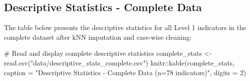 \documentclass[
  letterpaper,
  DIV=11,
  numbers=noendperiod]{scrartcl}
\newenvironment{Shaded}{\begin{snugshade}}{\end{snugshade}}
\newcommand{\AttributeTok}[1]{\textcolor[rgb]{0.40,0.45,0.13}{#1}}
\newcommand{\CommentTok}[1]{\textcolor[rgb]{0.37,0.37,0.37}{#1}}
\newcommand{\DecValTok}[1]{\textcolor[rgb]{0.68,0.00,0.00}{#1}}
\newcommand{\FunctionTok}[1]{\textcolor[rgb]{0.28,0.35,0.67}{#1}}
\newcommand{\NormalTok}[1]{\textcolor[rgb]{0.00,0.23,0.31}{#1}}
\newcommand{\OtherTok}[1]{\textcolor[rgb]{0.00,0.23,0.31}{#1}}
\newcommand{\SpecialCharTok}[1]{\textcolor[rgb]{0.37,0.37,0.37}{#1}}
\newcommand{\StringTok}[1]{\textcolor[rgb]{0.13,0.47,0.30}{#1}}
\begin{document}
\subsection{Descriptive Statistics - Complete
Data}\label{descriptive-statistics---complete-data}

The table below presents the descriptive statistics for all Level 1
indicators in the complete dataset after kNN imputation and case-wise
cleaning:

\begin{Shaded}
\begin{Highlighting}[]
\CommentTok{\# Read and display complete descriptive statistics}
\NormalTok{complete\_stats }\OtherTok{\textless{}{-}} \FunctionTok{read.csv}\NormalTok{(}\StringTok{"data/descriptive\_stats\_complete.csv"}\NormalTok{)}
\NormalTok{knitr}\SpecialCharTok{::}\FunctionTok{kable}\NormalTok{(complete\_stats, }\AttributeTok{caption =} \StringTok{"Descriptive Statistics {-} Complete Data (n=78 indicators)"}\NormalTok{, }\AttributeTok{digits =} \DecValTok{2}\NormalTok{)}
\end{Highlighting}
\end{Shaded}
\end{document}
